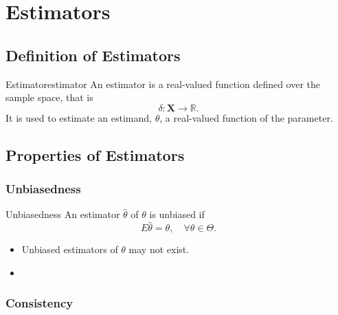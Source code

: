 \section{Estimators}

\subsection{Definition of Estimators}

\begin{definition}{Estimator}{estimator}
    An estimator is a real-valued function defined over the sample space, that is
    \begin{equation}
        \delta:\textbf{X}\rightarrow\mathbb{R}.
    \end{equation}
    It is used to estimate an estimand, $\theta$, a real-valued function of the parameter.
\end{definition}

\subsection{Properties of Estimators}

\subsubsection*{Unbiasedness}

\begin{definition}{Unbiasedness}{}
    An estimator $\hat{\theta}$ of $\theta$ is unbiased if
    \begin{equation}
        E\hat{\theta}=\theta,\quad\forall\theta\in\Theta.
    \end{equation}
\end{definition}

\begin{note}
    \begin{itemize}
        \item Unbiased estimators of $\theta$ may not exist.
        \item
    \end{itemize}
\end{note}

\begin{example}

\end{example}

\subsubsection*{Consistency}

